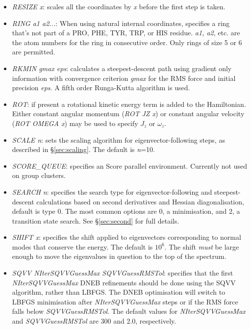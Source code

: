 \documentclass[12pt,a4paper,dvips]{article}
\begin{document}
\begin{itemize}
\item {\it RESIZE x\/}: scales all the coordinates by {\it x}
before the first step is taken. 

\item {\it RING a1 a2...}: When using natural internal coordinates, specifies
  a ring that's not part of a PRO, PHE, TYR, TRP, or HIS residue. {\it a1,
  a2}, etc. are the atom numbers for the ring in consecutive order. Only rings
  of size 5 or 6 are permitted.

\item {\it RKMIN gmax eps\/}: calculates a steepest-descent path using gradient only
      information with convergence criterion {\it gmax\/} for the RMS force and initial
      precision {\it eps\/}. A fifth order Runga-Kutta algorithm is used.

\item {\it ROT\/}: if present a rotational kinetic energy term is
added to the Hamiltonian. Either constant angular momentum ({\it ROT JZ x\/}) or
constant angular velocity ({\it ROT OMEGA x\/}) may be used to specify $J_z$
or $\omega_z$.


\item {\it SCALE n\/}: sets the scaling algorithm for eigenvector-following
steps, as described in \S\ref{sec:scaling}. The default is {\it n\/}=10.

\item {\it SCORE\_QUEUE\/}: specifies an Score parallel environment. 
Currently not used on group clusters.

\item {\it SEARCH n\/}: specifies the search type for eigenvector-following and
steepest-descent calculations based on second derivatives and Hessian diagonalisation, default is type 0.
The most common options are 0, a minimisation, and 2, a transition state search. See
\S\ref{sec:second} for full details.

\item {\it SHIFT x\/}: specifies the shift applied to eigenvectors corresponding
to normal modes that conserve the energy. The default is $10^6$. The shift {\it must\/} be
large enough to move the eigenvalues in question to the top of the spectrum.

\item {\it SQVV NIterSQVVGuessMax SQVVGuessRMSTol\/}:
specifies that the first {\it NIterSQVVGuessMax\/} DNEB refinements should be
done using the SQVV algorithm, rather than LBFGS.\cite{TrygubenkoW04}
The DNEB optimisation will switch to LBFGS minimisation after {\it NIterSQVVGuessMax\/}
steps or if the RMS force falls below {\it SQVVGuessRMSTol\/}.
The default values for {\it NIterSQVVGuessMax\/} and {\it SQVVGuessRMSTol\/}
are 300 and 2.0, respectively.


\end{itemize}
\end{document}
